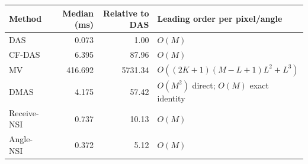 \begin{tabular}{@{}lrrl@{}}
\toprule
Method & Median (ms) & Relative to DAS & Leading order per pixel/angle \\
\midrule
DAS & 0.073 & 1.00 & $O(M)$ \\
CF-DAS & 6.395 & 87.96 & $O(M)$ \\
MV & 416.692 & 5731.34 & $O((2K+1)(M-L+1)L^2+L^3)$ \\
DMAS & 4.175 & 57.42 & $O(M^2)$ direct; $O(M)$ exact identity \\
Receive-NSI & 0.737 & 10.13 & $O(M)$ \\
Angle-NSI & 0.372 & 5.12 & $O(M)$ \\
\bottomrule
\end{tabular}
